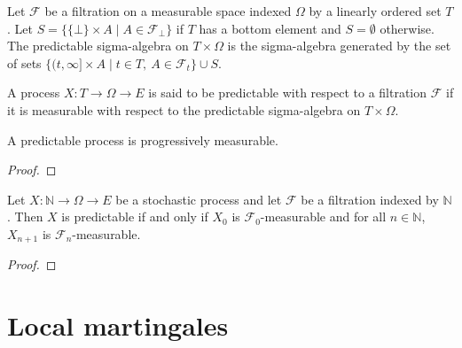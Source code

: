 \begin{definition}\label{def:predictableMeasurableSpace}
  \leanok
Let $\mathcal{F}$ be a filtration on a measurable space indexed $\Omega$ by a linearly ordered set $T$.
Let $S = \{\{\bot\} \times A \mid A \in \mathcal{F}_\bot\}$ if $T$ has a bottom element and $S = \emptyset$ otherwise.
The predictable sigma-algebra on $T \times \Omega$ is the sigma-algebra generated by the set of sets $\{(t, \infty] \times A \mid t \in T, \: A \in \mathcal{F}_t\} \cup S$.
\end{definition}


\begin{definition}\label{def:predictable}
  \leanok
A process $X : T \to \Omega \to E$ is said to be predictable with respect to a filtration $\mathcal{F}$ if it is measurable with respect to the predictable sigma-algebra on $T \times \Omega$.
\end{definition}


\begin{lemma}\label{lem:Predictable.progressive}
  \leanok
A predictable process is progressively measurable.
\end{lemma}

\begin{proof}

\end{proof}


\begin{lemma}\label{lem:predictable_nat_iff}
  \leanok
Let $X : \mathbb{N} \to \Omega \to E$ be a stochastic process and let $\mathcal{F}$ be a filtration indexed by $\mathbb{N}$.
Then $X$ is predictable if and only if $X_0$ is $\mathcal{F}_0$-measurable and for all $n \in \mathbb{N}$, $X_{n+1}$ is $\mathcal{F}_n$-measurable.
\end{lemma}

\begin{proof}

\end{proof}



\section{Local martingales}


